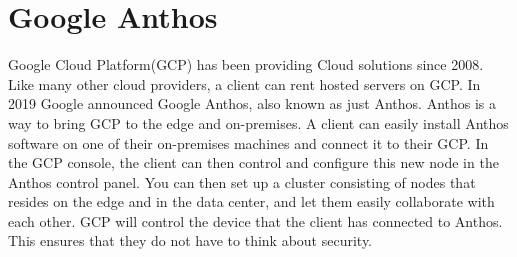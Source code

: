 


\section{Google Anthos}
Google Cloud Platform(GCP) has been providing Cloud solutions since 2008. Like many other cloud providers, a client can rent hosted servers on GCP. In 2019 Google announced Google Anthos, also known as just Anthos. Anthos is a way to bring GCP to the edge and on-premises\cite{noauthor_anthos_nodate}. A client can easily install Anthos software on one of their on-premises machines and connect it to their GCP. In the GCP console, the client can then control and configure this new node in the Anthos control panel. You can then set up a cluster consisting of nodes that resides on the edge and in the data center, and let them easily collaborate with each other. GCP will control the device that the client has connected to Anthos. This ensures that they do not have to think about security.

